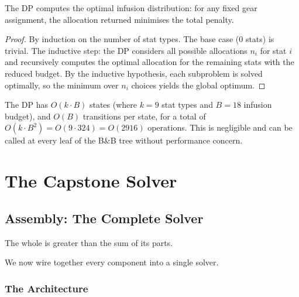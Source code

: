 \documentclass[11pt, a4paper, oneside]{book}
\begin{document}
\begin{thmbox}[title={Optimality of Infusion DP}]
The DP computes the optimal infusion distribution: for any fixed gear
assignment, the allocation returned minimises the total penalty.
\end{thmbox}

\begin{proof}
By induction on the number of stat types.  The base case (0 stats) is
trivial.  The inductive step: the DP considers all possible allocations
$n_i$ for stat $i$ and recursively computes the optimal allocation for
the remaining stats with the reduced budget.  By the inductive hypothesis,
each subproblem is solved optimally, so the minimum over $n_i$ choices
yields the global optimum.
\end{proof}

The DP has $O(k \cdot B)$ states (where $k = 9$ stat types and $B = 18$
infusion budget), and $O(B)$ transitions per state, for a total of
$O(k \cdot B^2) = O(9 \cdot 324) = O(2916)$ operations.  This is negligible
and can be called at every leaf of the B\&B tree without performance concern.

\part{The Capstone Solver}

\chapter{Assembly: The Complete Solver}
\label{ch:assembly}

\epigraph{The whole is greater than the sum of its parts.}{}

We now wire together every component into a single solver.

\section{The Architecture}
\end{document}
